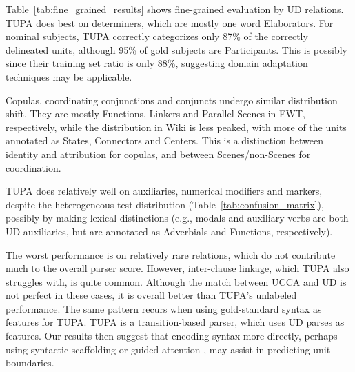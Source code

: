 \documentclass[11pt,a4paper,table]{article}
\begin{document}
Table~\ref{tab:fine_grained_results} shows
fine-grained evaluation by UD relations.
TUPA does best on determiners, which are mostly one word Elaborators.
For nominal subjects,
TUPA correctly categorizes only 87\% of the correctly delineated units,
although 95\% of gold subjects are Participants.
This is possibly since their training set ratio is only 88\%,
suggesting domain adaptation techniques may be applicable.

Copulas, coordinating conjunctions and conjuncts
undergo similar distribution shift.
They are mostly Functions, Linkers and Parallel Scenes in EWT, respectively,
while the distribution in Wiki is less peaked, with more of the units annotated as
States, Connectors and Centers.
This is a distinction between identity and attribution for copulas,
and between Scenes/non-Scenes for coordination.

TUPA does relatively well on auxiliaries, numerical modifiers and markers,
despite the heterogeneous test distribution (Table~\ref{tab:confusion_matrix}),
possibly by making lexical distinctions
(e.g., modals and auxiliary verbs are both UD auxiliaries,
but are annotated as Adverbials and Functions, respectively).

The worst performance is on relatively rare relations,
which do not contribute much to the overall parser score.
However, inter-clause linkage, which TUPA also struggles with, is quite common.
Although the match between UCCA and UD is not perfect in these cases,
it is overall better than TUPA's unlabeled performance.
The same pattern recurs when using gold-standard syntax as features for TUPA.
TUPA is a transition-based parser, which uses UD parses as features. Our
results then suggest that encoding syntax more directly, perhaps using syntactic
scaffolding \citep{swayamdipta2018syntactic}
or guided attention \citep{strubell2018linguistically},
may assist in predicting unit boundaries.
\end{document}
